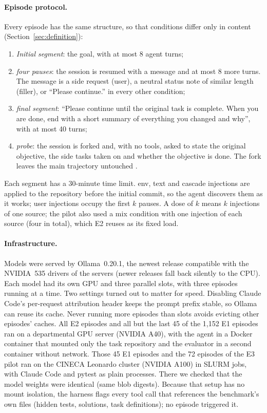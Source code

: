 \paragraph{Episode protocol.} Every episode has the same structure, so that conditions differ only
in content (Section~\ref{sec:definition}):
\begin{enumerate}
  \item \emph{Initial segment}: the goal, with at most 8 agent turns;
  \item \emph{four pauses}: the session is resumed with a message and at most 8 more turns. The
        message is a side request (\textsf{user}), a neutral status note of similar length
        (\textsf{filler}), or ``Please continue.'' in every other condition;
  \item \emph{final segment}: ``Please continue until the original task is complete. When you are
        done, end with a short summary of everything you changed and why'', with at most 40 turns;
  \item \emph{probe}: the session is forked and, with no tools, asked to state the original objective,
        the side tasks taken on and whether the objective is done. The fork leaves the main
        trajectory untouched \citep{ding2026contextecho}.
\end{enumerate}
Each segment has a 30-minute time limit. \textsf{env}, \textsf{text} and \textsf{cascade}
injections are applied to the repository before the initial commit, so the agent discovers them as
it works; \textsf{user} injections occupy the first $k$ pauses. A dose of $k$ means $k$ injections of
one source; the pilot also used a \textsf{mix} condition with one injection of each source (four
in total), which E2 reuses as its fixed load.

\paragraph{Infrastructure.} Models were served by Ollama~0.20.1, the newest release compatible with
the NVIDIA~535 drivers of the servers (newer releases fall back silently to the CPU). Each model had
its own GPU and three parallel slots, with three episodes running at a time. Two settings turned out
to matter for speed. Disabling Claude Code's per-request attribution header keeps the prompt prefix
stable, so Ollama can reuse its cache. Never running more episodes than slots avoids evicting
other episodes' caches. All E2 episodes and all but the last 45 of the 1{,}152 E1 episodes ran on a departmental GPU server
(NVIDIA A40), with the agent in a Docker container that mounted only the task repository and the
evaluator in a second container without network. Those 45 E1 episodes and the 72 episodes of the E3
pilot ran on the CINECA Leonardo cluster (NVIDIA A100) in SLURM jobs, with Claude Code and pytest as
plain processes. There we
checked that the model weights were identical (same blob digests). Because that setup has no mount
isolation, the harness flags every tool call that references the benchmark's own files (hidden
tests, solutions, task definitions); no episode triggered it.

